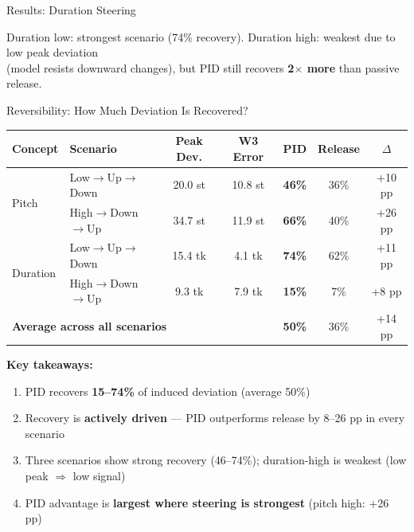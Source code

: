 \documentclass[aspectratio=169]{beamer}
\begin{document}
\begin{frame}{Results: Duration Steering}
\vspace{1em}
\begin{center}
Duration low: strongest scenario (74\% recovery). Duration high: weakest due to low peak deviation\\
(model resists downward changes), but PID still recovers \textbf{2$\times$ more} than passive release.
\end{center}

\end{frame}

\begin{frame}{Reversibility: How Much Deviation Is Recovered?}

\begin{center}
\begin{tabular}{llccccc}
    \toprule
    \textbf{Concept} & \textbf{Scenario} & \textbf{Peak Dev.} & \textbf{W3 Error} & \textbf{PID} & \textbf{Release} & \textbf{$\Delta$} \\
    \midrule
    \multirow{2}{*}{Pitch} & Low$\to$Up$\to$Down & 20.0 st & 10.8 st & \textbf{46\%} & 36\% & +10 pp \\
    & High$\to$Down$\to$Up & 34.7 st & 11.9 st & \textbf{66\%} & 40\% & +26 pp \\
    \midrule
    \multirow{2}{*}{Duration} & Low$\to$Up$\to$Down & 15.4 tk & 4.1 tk & \textbf{74\%} & 62\% & +11 pp \\
    & High$\to$Down$\to$Up & 9.3 tk & 7.9 tk & \textbf{15\%} & 7\% & +8 pp \\
    \midrule
    \multicolumn{4}{l}{\textbf{Average across all scenarios}} & \textbf{50\%} & 36\% & +14 pp \\
    \bottomrule
\end{tabular}
\end{center}

\vspace{1em}

\textbf{Key takeaways:}
\begin{enumerate}
    \item PID recovers \textbf{15--74\%} of induced deviation (average 50\%)
    \item Recovery is \textbf{actively driven} --- PID outperforms release by 8--26 pp in every scenario
    \item Three scenarios show strong recovery (46--74\%); duration-high is weakest (low peak $\Rightarrow$ low signal)
    \item PID advantage is \textbf{largest where steering is strongest} (pitch high: +26 pp)
\end{enumerate}

\end{frame}
\end{document}
